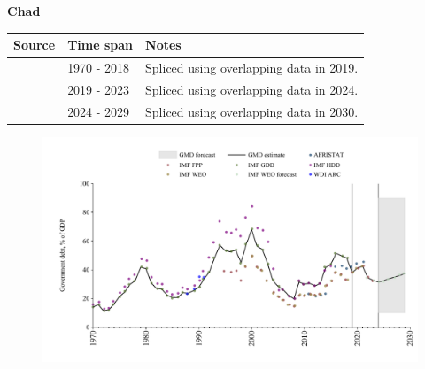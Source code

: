 \documentclass[12pt,a4paper,landscape]{article}
\begin{document}
\begin{adjustbox}{max totalsize={\paperwidth}{\paperheight},center}
\begin{minipage}[t][\textheight][t]{\textwidth}
\vspace*{0.5cm}
{}
\begin{center}
{\Large\bfseries Chad}
\end{center}
\vspace{0.5cm}
\begin{table}[H]
\centering
\small
\begin{tabular}{|l|l|l|}
\hline
\textbf{Source} & \textbf{Time span} & \textbf{Notes} \\
\hline
\rowcolor{white}\cite{IMF_GDD}& 1970 - 2018 &Spliced using overlapping data in 2019.\\
\rowcolor{lightgray}\cite{IMF_FPP}& 2019 - 2023 &Spliced using overlapping data in 2024.\\
\rowcolor{white}\cite{IMF_WEO_forecast}& 2024 - 2029 &Spliced using overlapping data in 2030.\\
\hline
\end{tabular}
\end{table}
\begin{figure}[H]
\centering
\includegraphics[width=\textwidth,height=0.6\textheight,keepaspectratio]{graphs/TCD_govdebt_GDP.pdf}
\end{figure}
\end{minipage}
\end{adjustbox}
\end{document}
